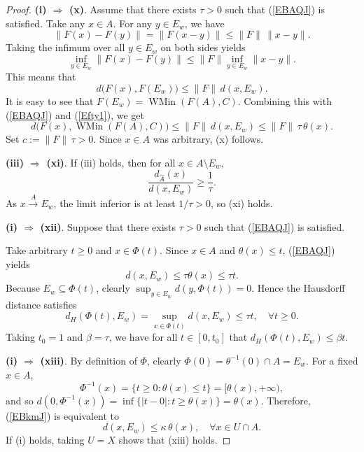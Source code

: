 \documentclass[10pt,a4paper]{amsart}
\begin{document}
\begin{proof}
	\noindent\textbf{(i) $\Rightarrow$ (x)}.
Assume that  there exists    \(\tau > 0\) such that   (\ref{EBAQJ})  is satisfied.    Take any $x\in A$. 
For any $y\in E_w$,  we have
\[
\|F(x)-F(y)\|=\|F(x-y)\|\le\|F\|\,\|x-y\|.
\]
Taking the infimum over all $y\in E_w$ on both sides yields
\[
\inf_{y\in E_w}\|F(x)-F(y)\|\le\|F\|\inf_{y\in E_w}\|x-y\|.
\]
This means that
\begin{equation}\label{Efty1}
	d \bigl(F(x),F(E_w)\bigr)\le\|F\|\,d(x,E_w).  
\end{equation}
It is easy to see that $F(E_w)=\operatorname{WMin}(F(A),C)$.
Combining this with   (\ref{EBAQJ})  and  (\ref{Efty1}), we get
\[
d \bigl(F(x),\operatorname{WMin}(F(A),C)\bigr)\le\|F\|\,d(x,E_w)   \le\|F\|\,\tau\,\theta(x).
\]
Set $c:=\|F\|\,\tau >0$. Since $x\in A$ was arbitrary, (x) follows.	 		
	 		
	 		
	 	\noindent\textbf{(iii) $\Rightarrow$ (xi)}.
	 If (iii) holds, then for all $x\in A\setminus E_w$,
	 \[
	 \frac{d_{\widehat{A}}(x)}{d(x,E_w)}\ge\frac{1}{\tau}.
	 \]
	 As $x\xrightarrow{A} E_w$, the limit inferior is at least $1/\tau>0$, so (xi) holds.		
	 		
		 	\noindent\textbf{(i) $\Rightarrow$ (xii)}.
Suppose that  there exists \(\tau > 0\) such that   (\ref{EBAQJ})  is satisfied.

Take arbitrary \(t \ge 0\) and \(x \in \Phi(t)\). Since \(x \in A\) and \(\theta(x) \le t\),   (\ref{EBAQJ})  yields
\[
d(x, E_w) \le \tau \theta(x) \le \tau t.
\]
Because \(E_w \subseteq \Phi(t)\), clearly \(\sup_{y \in E_w} d(y, \Phi(t)) = 0\). Hence the Hausdorff distance satisfies
\[
d_H(\Phi(t), E_w) = \sup_{x \in \Phi(t)} d(x, E_w) \le \tau t, \quad \forall t \ge 0.
\]
Taking \(t_0 = 1\) and \(\beta = \tau\), we have for all \(t \in [0, t_0]\) that \(d_H(\Phi(t), E_w) \le \beta t\). 	 		
	 		
	
	\noindent\textbf{(i) $\Rightarrow$ (xiii)}.
	By definition of $\Phi$, clearly $\Phi(0)=\theta^{-1}(0)\cap A=E_w$.
	For a fixed $x\in A$,
	\[
	\Phi^{-1}(x)=\{t\ge0:\theta(x)\le t\}=[\theta(x),+\infty),
	\]
and	so $d(0,\Phi^{-1}(x))=\inf\{|t-0|:t\ge\theta(x)\}=\theta(x)$.
	Therefore,      (\ref{EBkmJ})    is equivalent to
\begin{equation}\label{EViiiD}
	d(x,E_w)\le\kappa\,\theta(x),\quad\forall x\in U\cap A.
 \end{equation}
	If (i) holds, taking $U=X$ shows that (xiii) holds.
	
	
	
	
	
	
	

\end{proof}
\end{document}
